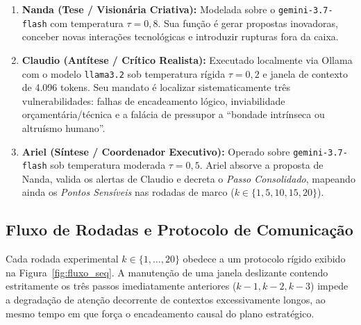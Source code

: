 \documentclass[runningheads]{llncs}
\begin{document}
\begin{enumerate}
    \item \textbf{Nanda (Tese / Vision\'aria Criativa):} Modelada sobre o \texttt{gemini-3.7-flash} com temperatura $\tau = 0,8$. Sua fun\c{c}\~ao \'e gerar propostas inovadoras, conceber novas intera\c{c}\~oes tecnol\'ogicas e introduzir rupturas fora da caixa.
    \item \textbf{Claudio (Ant\'itese / Cr\'itico Realista):} Executado localmente via Ollama com o modelo \texttt{llama3.2} sob temperatura r\'igida $\tau = 0,2$ e janela de contexto de 4.096 tokens. Seu mandato \'e localizar sistematicamente tr\^es vulnerabilidades: falhas de encadeamento l\'ogico, inviabilidade or\c{c}ament\'aria/t\'ecnica e a fal\'acia de pressupor a ``bondade intr\'inseca ou altru\'ismo humano''.
    \item \textbf{Ariel (S\'intese / Coordenador Executivo):} Operado sobre \texttt{gemini-3.7-flash} sob temperatura moderada $\tau = 0,5$. Ariel absorve a proposta de Nanda, valida os alertas de Claudio e decreta o \emph{Passo Consolidado}, mapeando ainda os \emph{Pontos Sens\'iveis} nas rodadas de marco ($k \in \{1, 5, 10, 15, 20\}$).
\end{enumerate}

\subsection{Fluxo de Rodadas e Protocolo de Comunica\c{c}\~ao}

Cada rodada experimental $k \in \{1, \dots, 20\}$ obedece a um protocolo r\'igido exibido na Figura~\ref{fig:fluxo_seq}. A manuten\c{c}\~ao de uma janela deslizante contendo estritamente os tr\^es passos imediatamente anteriores ($k-1, k-2, k-3$) impede a degrada\c{c}\~ao de aten\c{c}\~ao decorrente de contextos excessivamente longos, ao mesmo tempo em que for\c{c}a o encadeamento causal do plano estrat\'egico.
\end{document}

